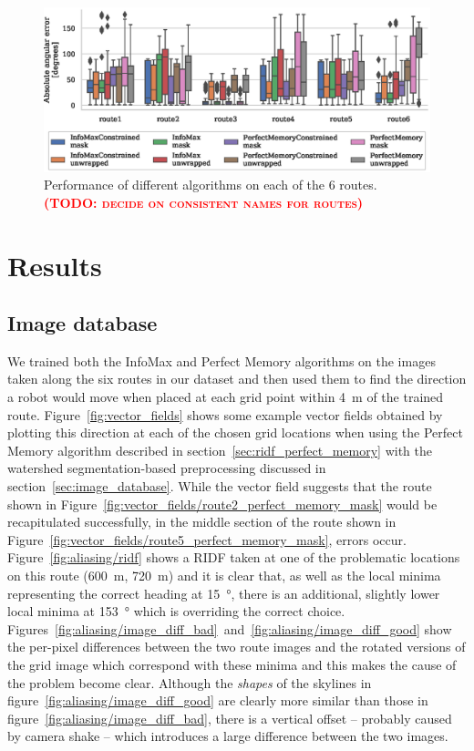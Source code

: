 \documentclass[letterpaper]{article}
\newcommand{\todo}[1]{\textbf{\textsc{\textcolor{red}{(TODO: #1)}}}}
\begin{document}
\begin{figure}[t]
    \centering
    \includegraphics{figures/route_benchmark.eps}
    \caption{Performance of different algorithms on each of the 6 routes. \todo{decide on consistent names for routes}}
    \label{fig:route_benchmark}
\end{figure}

\section{Results}
\subsection{Image database}
We trained both the InfoMax and Perfect Memory algorithms on the images taken along the six routes in our dataset and then used them to find the direction a robot would move when placed at each grid point within \SI{4}{\metre} of the trained route. 
Figure~\ref{fig:vector_fields} shows some example vector fields obtained by plotting this direction at each of the chosen grid locations when using the Perfect Memory algorithm described in section~\ref{sec:ridf_perfect_memory} with the watershed segmentation-based preprocessing discussed in section~\ref{sec:image_database}. 
While the vector field suggests that the route shown in Figure~\ref{fig:vector_fields/route2_perfect_memory_mask} would be recapitulated successfully, in the middle section of the route shown in Figure~\ref{fig:vector_fields/route5_perfect_memory_mask}, errors occur.
Figure~\ref{fig:aliasing/ridf} shows a RIDF taken at one of the problematic locations on this route (\SI{600}{\metre}, \SI{720}{\metre}) and it is clear that, as well as the local minima representing the correct heading at \SI{15}{\degree}, there is an additional, slightly lower local minima at \SI{153}{\degree} which is overriding the correct choice.
Figures~\ref{fig:aliasing/image_diff_bad}~and~\ref{fig:aliasing/image_diff_good} show the per-pixel differences between the two route images and the rotated versions of the grid image which correspond with these minima and this makes the cause of the problem become clear.
Although the \emph{shapes} of the skylines in figure~\ref{fig:aliasing/image_diff_good} are clearly more similar than those in figure~\ref{fig:aliasing/image_diff_bad}, there is a vertical offset -- probably caused by camera shake -- which introduces a large difference between the two images.
\end{document}
